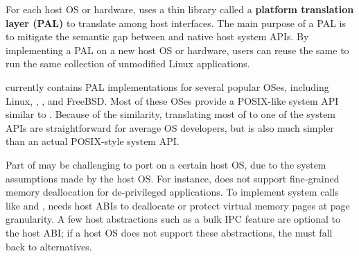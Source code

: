 For each host OS or hardware, \graphene{} uses
a thin library called a {\bf platform translation layer (PAL)}
to translate among host interfaces.
The main purpose of a PAL is to mitigate the semantic gap
between \thehostabi{} and
native host system APIs.
By implementing a PAL on a new host OS or hardware,
users can reuse
the same \libos{} to run the same collection of unmodified Linux applications.







\graphene{} currently contains PAL implementations for several popular OSes,
including Linux, \win{}, \osx{}, and FreeBSD.
Most of these OSes provide a POSIX-like system API similar to \thehostabi{}.
Because of the similarity, translating most of \thehostabi{} to one of the system APIs
are straightforward for average OS developers,
but \thehostabi{} is also much simpler than an actual POSIX-style system API.



Part of \thehostabi{} may be challenging to port
on a certain host OS,
due to the system assumptions made by the host OS.
For instance, \win{} does not support
fine-grained memory deallocation for de-privileged applications.
To implement system calls like  and ,
\graphene{} needs host ABIs to
deallocate or protect virtual memory pages at page granularity.
A few host abstractions such as a bulk IPC feature are
optional to the host ABI;
if a host OS does not support these abstractions,
the \libos{} must fall back to alternatives. 

